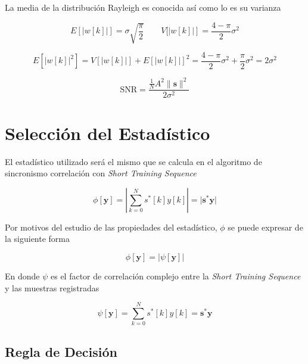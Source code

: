 La media de la distribución Rayleigh es conocida así como lo es su varianza

\begin{equation}
E\left[\lvert w[k]\rvert\right] = \sigma \sqrt{\frac{\pi}{2}}\qquad V[\left\lvert w[k] \rvert\right] = \frac{4-\pi}{2} \sigma^2
\end{equation}

\begin{equation}
E\left[\lvert w[k]\rvert^2\right] = V\left[\lvert w[k]\rvert\right] + E\left[\lvert w[k]\rvert\right]^2 = \frac{4-\pi}{2}\sigma^2 + \frac{\pi}{2}\sigma^2 = 2\sigma^2
\end{equation}

\begin{equation}
\text{SNR} = \frac{\frac{1}{N} A^2 \lVert \mathbf{s} \rVert ^2}{2 \sigma^2}
\end{equation}

\section{Selección del Estadístico}

El estadístico utilizado será el mismo que se calcula en el algoritmo de sincronismo correlación con \textit{Short Training Sequence}

\begin{equation}
    \phi[\mathbf{y}] = \left\lvert\sum_{k=0}^N s^\ast[k]y[k]\right\rvert = \lvert \mathbf{s}^\ast\mathbf{y}\rvert
\end{equation}

Por motivos del estudio de las propiedades del estadístico, $\phi$ se puede expresar de la siguiente forma

\begin{equation}
    \phi[\mathbf{y}] = \lvert \psi[\mathbf{y}]\vert
\end{equation}

En donde $\psi$ es el factor de correlación complejo entre la \textit{Short Training Sequence} y las muestras registradas

\begin{equation}
    \psi[\mathbf{y}] = \sum_{k=0}^N s^\ast[k]y[k] = \mathbf{s}^\ast\mathbf{y}
\end{equation}

\subsection{Regla de Decisión}

